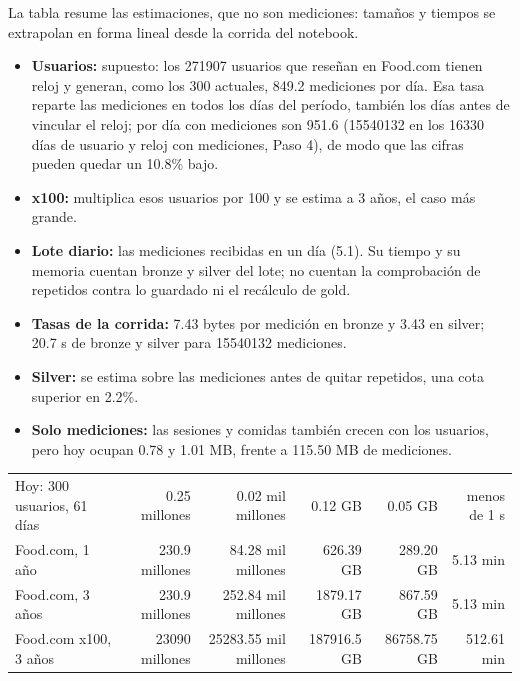 \documentclass[11pt]{article}
\begin{document}
 La tabla resume las
estimaciones, que no son mediciones: tamaños y tiempos se extrapolan en
forma lineal desde la corrida del notebook.
\begin{itemize}
  \item \textbf{Usuarios:} supuesto: los 271907 usuarios que reseñan en
  Food.com tienen reloj y generan, como los 300 actuales, 849.2 mediciones
  por día. Esa tasa reparte las mediciones en todos los días del período,
  también los días antes de vincular el reloj; por día con mediciones son
  951.6 (15540132 en los 16330 días de usuario y reloj con mediciones, Paso
  4), de modo que las cifras pueden quedar un 10.8\% bajo.
  \item \textbf{x100:} multiplica esos usuarios por 100 y se estima a 3
  años, el caso más grande.
  \item \textbf{Lote diario:} las mediciones recibidas en un día (5.1). Su
  tiempo y su memoria cuentan bronze y silver del lote; no cuentan la
  comprobación de repetidos contra lo guardado ni el recálculo de gold.
  \item \textbf{Tasas de la corrida:} 7.43 bytes por medición en bronze y
  3.43 en silver; 20.7 s de bronze y silver para 15540132 mediciones.
  \item \textbf{Silver:} se estima sobre las mediciones antes de quitar
  repetidos, una cota superior en 2.2\%.
  \item \textbf{Solo mediciones:} las sesiones y comidas también crecen con
  los usuarios, pero hoy ocupan 0.78 y 1.01 MB, frente a 115.50 MB de
  mediciones.
\end{itemize}

\begingroup\iniciartabla\small
\begin{tabularx}{\textwidth}{|Y|r|r|r|r|r|}\hline
{} &  &  &
 &  & \\\hline
Hoy: 300 usuarios, 61 días & 0.25 millones & 0.02 mil millones & 0.12 GB &
0.05 GB & menos de 1 s\\\hline
Food.com, 1 año & 230.9 millones & 84.28 mil millones & 626.39 GB & 289.20 GB
& 5.13 min\\\hline
Food.com, 3 años & 230.9 millones & 252.84 mil millones & 1879.17 GB & 867.59
GB & 5.13 min\\\hline
Food.com x100, 3 años & 23090 millones & 25283.55 mil millones & 187916.5 GB &
86758.75 GB & 512.61 min\\\hline
\end{tabularx}
\endgroup
\end{document}
